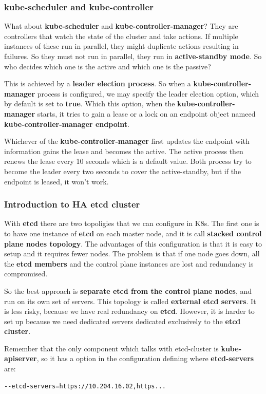 \documentclass{article}
\newenvironment{codetemplate}[1][]{%
  \mybasecolorbox[#1]
  \itshape
}{%
  \endmybasecolorbox
}
\begin{document}
\subsubsection{kube-scheduler and kube-controller}
What about \textbf{kube-scheduler} and \textbf{kube-controller-manager}? They are controllers that watch the state of the cluster and take actions. If multiple instances of these run in parallel,
they might duplicate actions resulting in failures. So they must not run in parallel, they run in \textbf{active-standby mode}. So who decides which one is the active and which one is the passive? 

This is achieved by a \textbf{leader election process}.
So when a \textbf{kube-controller-manager} process is configured, we may specify the leader election option, which by default is set to \textbf{true}. Which this option, when the \textbf{kube-controller-manager} starts, it tries to gain a lease or a lock on an endpoint object
nameed \textbf{kube-controller-manager endpoint}.

Whichever of the \textbf{kube-controller-manager} first updates the endpoint with information gains the lease and becomes the active. The active process then renews the lease every 10 seconds which is a default value. Both process try to become the leader every two seconds to cover the active-standby, but if the endpoint is leased, it won't work.

\subsubsection{Introduction to HA etcd cluster}
With \textbf{etcd} there are two topoligies that we can configure in K8s. The first one is to have one instance of \textbf{etcd} on each master node, and it is call \textbf{stacked control plane nodes topology}. The advantages of this configuration is that it is easy to setup and it requires fewer nodes. The problem is that if one node goes down, all the \textbf{etcd members} and the control plane instances are lost and redundancy is compromised.

So the best approach is \textbf{separate etcd from the control plane nodes}, and run on its own set of servers. This topology is called \textbf{external etcd servers}. It is less risky, because we have real redundancy on \textbf{etcd}. However, it is harder to set up
because we need dedicated servers dedicated exclusively to the \textbf{etcd cluster}. 

Remember that the only component which talks with etcd-cluster is \textbf{kube-apiserver}, so it has a option in the configuration defining where \textbf{etcd-servers} are:
\begin{codetemplate}{}
\begin{verbatim}
--etcd-servers=https://10.204.16.02,https...
\end{verbatim}
\end{codetemplate}
\end{document}
